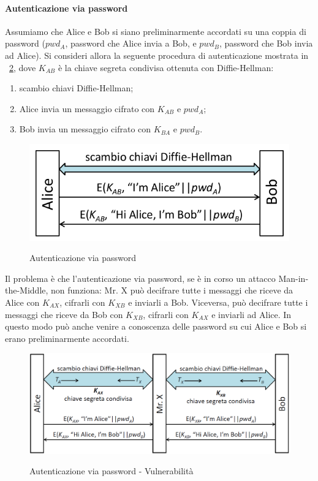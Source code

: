 \paragraph{Autenticazione via password}
Assumiamo che Alice e Bob si siano preliminarmente accordati su una coppia di password ($pwd_{A}$, password che Alice invia a Bob, e $pwd_{B}$, password che Bob invia ad Alice). Si consideri allora la seguente procedura di autenticazione mostrata in \figurename~\ref{fig:aut_via_pwd}, dove $K_{AB}$ è la chiave segreta condivisa ottenuta con Diffie-Hellman: 
\begin{enumerate}
\item scambio chiavi Diffie-Hellman;
\item Alice invia un messaggio cifrato con $K_{AB}$ e $pwd_{A}$;
\item Bob invia un messaggio cifrato con $K_{BA}$ e $pwd_{B}$.
\end{enumerate}
\begin{figure}[htbp]
	\centering%
	\subfigure%
	{\includegraphics[scale=0.5, keepaspectratio]{Immagini/chiave_pubblica/DiffieHellman_auth0.png}}
	\caption{Autenticazione via password}
	\label{fig:aut_via_pwd}
\end{figure}
Il problema è che l'autenticazione via password, se è in corso un attacco Man-in-the-Middle, non funziona: Mr. X può decifrare tutte i messaggi che riceve da Alice con $K_{AX}$, cifrarli con $K_{XB}$ e inviarli a Bob. Viceversa, può decifrare tutte i messaggi che riceve da Bob con $K_{XB}$, cifrarli con $K_{AX}$ e inviarli ad Alice. In questo modo può anche venire a conoscenza delle password su cui Alice e Bob si erano preliminarmente accordati.
\begin{figure}[htbp]
	\centering%
	\subfigure%
	{\includegraphics[scale=0.5, keepaspectratio]{Immagini/chiave_pubblica/DiffieHellman_passauth.png}}
	\caption{Autenticazione via password - Vulnerabilità}
	\label{fig:aut_via_pwd}
\end{figure}

